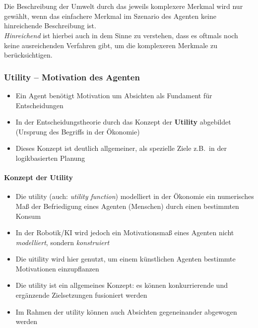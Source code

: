 \\ \\
Die Beschreibung der Umwelt durch das jeweils komplexere Merkmal wird nur gewählt, wenn das einfachere Merkmal im Szenario des Agenten keine hinreichende Beschreibung ist.\\
\textit{Hinreichend} ist hierbei auch in dem Sinne zu verstehen, dass es oftmals noch keine ausreichenden Verfahren gibt, um die komplexeren Merkmale zu berücksichtigen.

\subsubsection{Utility -- Motivation des Agenten}
\begin{itemize}
	\item Ein Agent benötigt Motivation um Absichten als Fundament für Entscheidungen
	\item In der Entscheidungstheorie durch das Konzept der \textbf{Utility} abgebildet (Ursprung des Begriffs in der Ökonomie)
	\item Dieses Konzept ist deutlich allgemeiner, als spezielle Ziele z.B.\ in der logikbasierten Planung	
\end{itemize}

\paragraph{Konzept der Utility}
\begin{itemize}
	\item Die utility (auch: \textit{utility function}) modelliert in der Ökonomie ein numerisches Maß der Befriedigung eines Agenten (Menschen) durch einen bestimmten Konsum
	\item In der Robotik/KI wird jedoch ein Motivationsmaß eines Agenten nicht \emph{modelliert}, sondern \emph{konstruiert}
	\item Die uitility wird hier genutzt, um einem künstlichen Agenten bestimmte Motivationen einzupflanzen
	\item Die utility ist ein allgemeines Konzept: es können konkurrierende und ergänzende Zielsetzungen fusioniert werden
	\item Im Rahmen der utility können auch Absichten gegeneinander abgewogen werden
\end{itemize}

